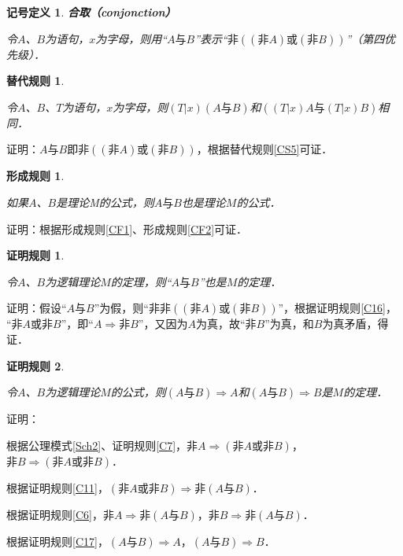 \documentclass[12pt, a4paper, oneside]{book}
\newtheorem{sign}{记号定义}
\newtheorem{CS}{替代规则}
\newtheorem{CF}{形成规则}
\newtheorem{C}{证明规则}
\begin{document}
			\begin{sign}
				\textbf{合取（conjonction）}
				\par
				令$A$、$B$为语句，$x$为字母，则用“$A\text{与}B$”表示“$\text{非}((\text{非}A)\text{或}(\text{非}B))$”（第四优先级）．
			\end{sign}

			\begin{CS}\label{CS6}
				\hfill\par
				令$A$、$B$、$T$为语句，$x$为字母，则$(T|x)(A\text{与}B)$和$((T|x)A\text{与}(T|x)B)$相同．
			\end{CS}
			证明：$A\text{与}B$即$\text{非}((\text{非}A)\text{或}(\text{非}B))$，根据替代规则\ref{CS5}可证．

			\begin{CF}\label{CF9}
				\hfill\par
				如果$A$、$B$是理论M的公式，则$A\text{与}B$也是理论$M$的公式．
			\end{CF}
			证明：根据形成规则\ref{CF1}、形成规则\ref{CF2}可证．

			\begin{C}\label{C20}
				\hfill\par
				令$A$、$B$为逻辑理论$M$的定理，则“$A\text{与}B$”也是$M$的定理．
			\end{C}
			证明：假设“$A\text{与}B$”为假，则“$\text{非}\text{非}((\text{非}A)\text{或}(\text{非}B))$”，根据证明规则\ref{C16}，\\“$\text{非}A\text{或}\text{非}B$”，即“$A\Rightarrow \text{非}B$”，又因为$A$为真，故“$\text{非}B$”为真，和$B$为真矛盾，得证．

			\begin{C}\label{C21}			
				\hfill\par
				令$A$、$B$为逻辑理论$M$的公式，则$(A\text{与}B)\Rightarrow A$和$(A\text{与}B)\Rightarrow B$是$M$的定理．
			\end{C}
			证明：
			\par
			根据公理模式\ref{Sch2}、证明规则\ref{C7}，$\text{非}A\Rightarrow (\text{非}A\text{或}\text{非}B)$，$\text{非}B\Rightarrow (\text{非}A\text{或}\text{非}B)$．
			\par
			根据证明规则\ref{C11}，$(\text{非}A\text{或}\text{非}B)\Rightarrow \text{非}(A\text{与}B)$．
			\par
			根据证明规则\ref{C6}，$\text{非}A\Rightarrow \text{非}(A\text{与}B)$，$\text{非}B\Rightarrow \text{非}(A\text{与}B)$．
			\par
			根据证明规则\ref{C17}，$(A\text{与}B)\Rightarrow A$，$(A\text{与}B)\Rightarrow B$．
			
\end{document}
